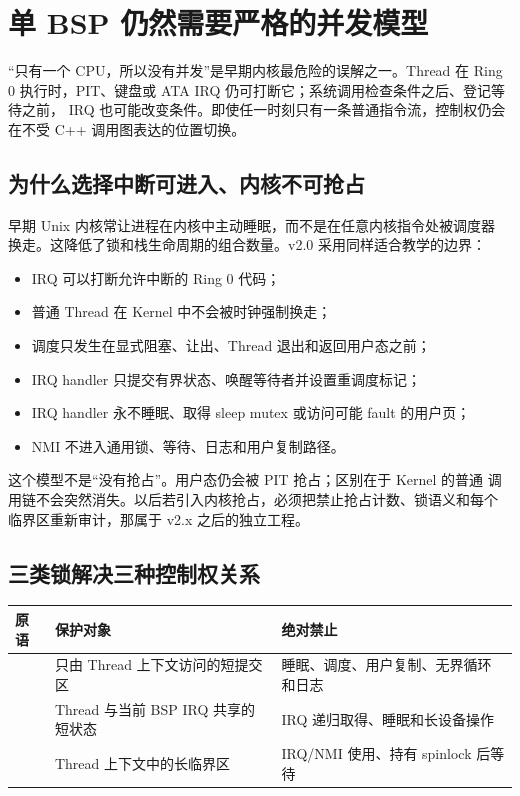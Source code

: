 \section{单 BSP 仍然需要严格的并发模型}

“只有一个 CPU，所以没有并发”是早期内核最危险的误解之一。Thread 在 Ring 0
执行时，PIT、键盘或 ATA IRQ 仍可打断它；系统调用检查条件之后、登记等待之前，
IRQ 也可能改变条件。即使任一时刻只有一条普通指令流，控制权仍会在不受 C++
调用图表达的位置切换。

\subsection{为什么选择中断可进入、内核不可抢占}

早期 Unix 内核常让进程在内核中主动睡眠，而不是在任意内核指令处被调度器
换走。这降低了锁和栈生命周期的组合数量。v2.0 采用同样适合教学的边界：

\begin{itemize}
  \item IRQ 可以打断允许中断的 Ring 0 代码；
  \item 普通 Thread 在 Kernel 中不会被时钟强制换走；
  \item 调度只发生在显式阻塞、让出、Thread 退出和返回用户态之前；
  \item IRQ handler 只提交有界状态、唤醒等待者并设置重调度标记；
  \item IRQ handler 永不睡眠、取得 sleep mutex 或访问可能 fault 的用户页；
  \item NMI 不进入通用锁、等待、日志和用户复制路径。
\end{itemize}

这个模型不是“没有抢占”。用户态仍会被 PIT 抢占；区别在于 Kernel 的普通
调用链不会突然消失。以后若引入内核抢占，必须把禁止抢占计数、锁语义和每个
临界区重新审计，那属于 v2.x 之后的独立工程。

\subsection{三类锁解决三种控制权关系}

\begin{longtable}{L{0.22\textwidth}L{0.29\textwidth}L{0.35\textwidth}}
\toprule
\textbf{原语} & \textbf{保护对象} & \textbf{绝对禁止}\\
\midrule
{} & 只由 Thread 上下文访问的短提交区 & 睡眠、调度、用户复制、无界循环和日志\\
 & Thread 与当前 BSP IRQ 共享的短状态 & IRQ 递归取得、睡眠和长设备操作\\
 & Thread 上下文中的长临界区 & IRQ/NMI 使用、持有 spinlock 后等待\\
\bottomrule
\end{longtable}

